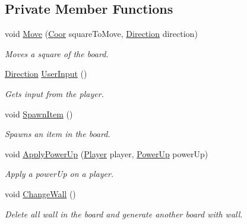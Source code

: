 \subsection*{Private Member Functions}
\begin{DoxyCompactItemize}
\item 
void \hyperlink{class_c_board_adc99d54f8a5d9ae58ef3d82cd314afb1}{Move} (\hyperlink{common_8hpp_af5a69199868671fc85779715443d7e7d}{Coor} square\-To\-Move, \hyperlink{common_8hpp_afe5d319262bda17c06308828231bd68c}{Direction} direction)
\begin{DoxyCompactList}\small\item\em Moves a square of the board. \end{DoxyCompactList}\item 
\hyperlink{common_8hpp_afe5d319262bda17c06308828231bd68c}{Direction} \hyperlink{class_c_board_a1a48e50a148927a5cf49f8261777d5fa}{User\-Input} ()
\begin{DoxyCompactList}\small\item\em Gets input from the player. \end{DoxyCompactList}\item 
void \hyperlink{class_c_board_a4095c3a98176578b2e1c478b5391eb1b}{Spawn\-Item} ()
\begin{DoxyCompactList}\small\item\em Spawns an item in the board. \end{DoxyCompactList}\item 
void \hyperlink{class_c_board_ab4117c3eab65f2cb45eb1d6ad6c26b21}{Apply\-Power\-Up} (\hyperlink{common_8hpp_a3b27da0d46d4c36bc71511bcea2db296}{Player} player, \hyperlink{common_8hpp_ab119e1d9a1ae19c7528143bf1fe16c3a}{Power\-Up} power\-Up)
\begin{DoxyCompactList}\small\item\em Apply a power\-Up on a player. \end{DoxyCompactList}\item 
\hypertarget{class_c_board_a3f41c4ac3c41c93d094c9cf0574e57d9}{void \hyperlink{class_c_board_a3f41c4ac3c41c93d094c9cf0574e57d9}{Change\-Wall} ()}\label{class_c_board_a3f41c4ac3c41c93d094c9cf0574e57d9}

\begin{DoxyCompactList}\small\item\em Delete all wall in the board and generate another board with wall. \end{DoxyCompactList}\end{DoxyCompactItemize}
